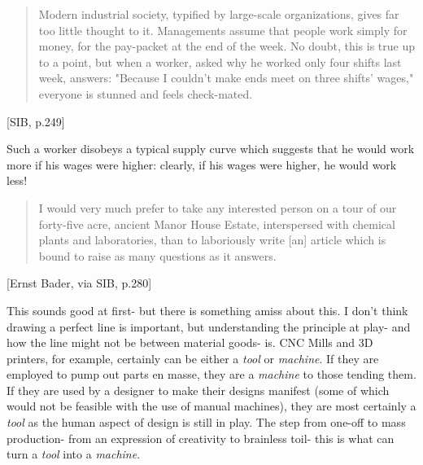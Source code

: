 \begin{quote}
  Modern industrial society, typified by large-scale organizations, gives far too little thought to it. Managements assume that people work simply for money, for the pay-packet at the end of the week. No doubt, this is true up to a point, but when a worker, asked why he worked only four shifts last week, answers: "Because I couldn't make ends meet on three shifts' wages," everyone is stunned and feels check-mated.
\end{quote}[SIB, p.249]

Such a worker disobeys a typical supply curve which suggests that he would work more if his wages were higher: clearly, if his wages were higher, he would work less!


\begin{quote}
  I would very much prefer to take any interested person on a tour of our forty-five acre, ancient Manor House Estate, interspersed with chemical plants and laboratories, than to laboriously write [an] article which is bound to raise as many questions as it answers.
\end{quote}[Ernst Bader, via SIB, p.280]











This sounds good at first- but there is something amiss about this. I don't think drawing a perfect line is important, but understanding the principle at play- and how the line might not be between material goods- is. CNC Mills and 3D printers, for example, certainly can be either a \textit{tool} or \textit{machine}. If they are employed to pump out parts en masse, they are a \textit{machine} to those tending them. If they are used by a designer to make their designs manifest (some of which would not be feasible with the use of manual machines), they are most certainly a \textit{tool} as the human aspect of design is still in play. The step from one-off to mass production- from an expression of creativity to brainless toil- this is what can turn a \textit{tool} into a \textit{machine}.